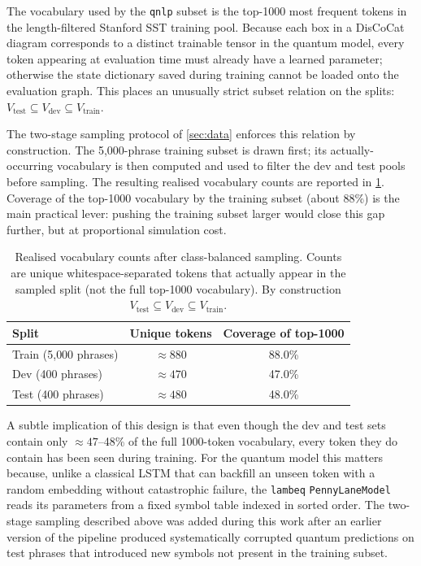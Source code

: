 \documentclass[runningheads]{llncs}
\begin{document}
The vocabulary used by the \texttt{qnlp} subset is the top-1000 most
frequent tokens in the length-filtered Stanford SST training pool.
Because each box in a DisCoCat diagram corresponds to a distinct
trainable tensor in the quantum model, every token appearing at
evaluation time must already have a learned parameter; otherwise the
state dictionary saved during training cannot be loaded onto the
evaluation graph. This places an unusually strict subset relation on
the splits: \(V_\text{test} \subseteq V_\text{dev} \subseteq V_\text{train}\).

The two-stage sampling protocol of \cref{sec:data} enforces this
relation by construction. The 5{,}000-phrase training subset is drawn
first; its actually-occurring vocabulary is then computed and used to
filter the dev and test pools before sampling. The resulting realised
vocabulary counts are reported in \cref{tab:vocab}. Coverage of the
top-1000 vocabulary by the training subset (about 88\%) is the main
practical lever: pushing the training subset larger would close this
gap further, but at proportional simulation cost.

\begin{table}[h!]
\centering
\caption{Realised vocabulary counts after class-balanced sampling. Counts
are unique whitespace-separated tokens that actually appear in the
sampled split (not the full top-1000 vocabulary). By construction
\(V_\text{test}\subseteq V_\text{dev}\subseteq V_\text{train}\).}
\label{tab:vocab}
\begin{tabular}{lcc}
\toprule
Split & Unique tokens & Coverage of top-1000 \\
\midrule
Train (5{,}000 phrases) & \(\approx 880\) & 88.0\% \\
Dev (400 phrases)       & \(\approx 470\) & 47.0\% \\
Test (400 phrases)      & \(\approx 480\) & 48.0\% \\
\bottomrule
\end{tabular}
\end{table}

A subtle implication of this design is that even though the dev and test
sets contain only \(\approx 47\)--48\% of the full 1000-token
vocabulary, every token they do contain has been seen during training.
For the quantum model this matters because, unlike a classical
LSTM that can backfill an unseen token with a random embedding without
catastrophic failure, the \texttt{lambeq} \texttt{PennyLaneModel} reads
its parameters from a fixed symbol table indexed in sorted order. The
two-stage sampling described above was added during this work after an
earlier version of the pipeline produced systematically corrupted
quantum predictions on test phrases that introduced new symbols not
present in the training subset.
\end{document}
